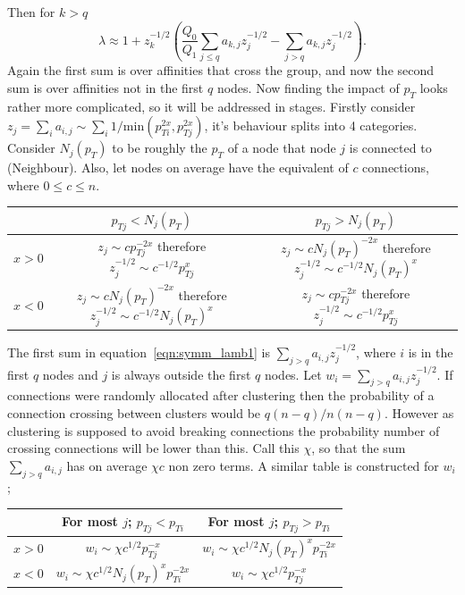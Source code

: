 Then for \(k > q\)
\begin{equation} \lambda \approx 1 + z_k^{-1/2} \left(\frac{Q_0}{Q_1}\sum_{j\leq q}a_{k,j}z_j^{-1/2} - \sum_{j > q} a_{k,j}z_j^{-1/2}\right).\end{equation}
Again the first sum is over affinities that cross the group, and now the second sum is over affinities not in the first \(q\) nodes.
Now finding the impact of \(p_T\) looks rather more complicated,
so it will be addressed in stages.
Firstly consider \(z_j = \sum_i a_{i,j} \sim \sum_i 1/\text{min}(p_{Ti}^{2x}, p_{Tj}^{2x}) \),
it's behaviour splits into 4 categories.
Consider \(N_j(p_T)\) to be roughly the \(p_T\) of a node that node \(j\) is connected to (Neighbour).
Also, let nodes on average have the equivalent of \(c\) connections, where \(0 \leq c \leq n\).
\begin{center}  %
    \begin{tabular}{c | c c}
                & \(p_{Tj} < N_j(p_T)\) & \(p_{Tj} > N_j(p_T)\) \\
        \hline
        \(x>0\) & \(z_j \sim cp_{Tj}^{-2x}\) therefore \(z_j^{-1/2} \sim c^{-1/2} p_{Tj}^{x}\) & \(z_j \sim cN_j(p_T)^{-2x}\) therefore \(z_j^{-1/2} \sim c^{-1/2}N_j(p_T)^{x}\)\\
        \(x<0\) & \(z_j \sim cN_j(p_T)^{-2x}\) therefore \(z_j^{-1/2} \sim c^{-1/2}N_j(p_T)^{x}\) & \(z_j \sim cp_{Tj}^{-2x}\) therefore \(z_j^{-1/2} \sim c^{-1/2} p_{Tj}^{x}\)\\
    \end{tabular}
\end{center}
The first sum in equation~\ref{eqn:symm_lamb1} is \(\sum_{j>q}a_{i,j} z_j^{-1/2}\),
where \(i\) is in the first \(q\) nodes and \(j\) is always outside the first \(q\) nodes.
Let \(w_{i} = \sum_{j>q}a_{i,j} z_j^{-1/2}\).
If connections were randomly allocated after clustering then the probability of a connection crossing between clusters would be \(q(n-q)/n(n-q)\).
However as clustering is supposed to avoid breaking connections the probability number of crossing connections will be lower than this.
Call this \(\chi\), so that the sum \(\sum_{j>q}a_{i,j}\) has on average \(\chi c\) non zero terms.
A similar table is constructed for \(w_{i}\);
\begin{center}
    \begin{tabular}{c | c c}
                & For most \(j\); \(p_{Tj} < p_{Ti}\) & For most \(j\); \(p_{Tj} > p_{Ti}\) \\
        \hline
        \(x>0\) & \(w_{i} \sim \chi c^{1/2}p_{Tj}^{-x}\) & \(w_{i} \sim \chi c^{1/2}N_j(p_T)^x p_{Ti}^{-2x}\)\\
        \(x<0\) & \(w_{i} \sim \chi c^{1/2}N_j(p_T)^x p_{Ti}^{-2x}\)& \(w_{i} \sim \chi c^{1/2}p_{Tj}^{-x}\)
    \end{tabular}
\end{center}

